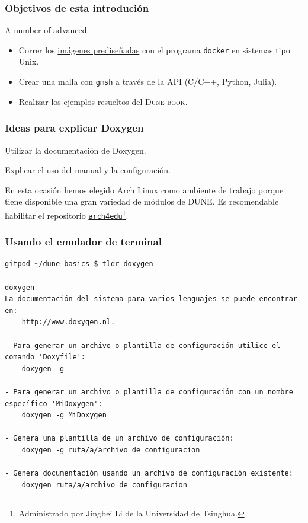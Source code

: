 




\begin{frame}
	\frametitle{Objetivos de esta introdución}
	A number of advanced.
	\begin{itemize}
		\item Correr los \href{https://github.com/orgs/cpp-review-dune/packages}{imágenes prediseñadas} con el programa \lstinline{docker} en sistemas tipo Unix.
		\item Crear una malla con \lstinline{gmsh} a través de la API (C/C++, Python, Julia).
		\item Realizar los ejemplos resueltos del \textsc{Dune book}.
	\end{itemize}
\end{frame}

\begin{frame}
	\frametitle{Ideas para explicar Doxygen}
	\begin{description}
		\item Utilizar la documentación de Doxygen.
		\item Explicar el uso del manual y la configuración.
	\end{description}
\end{frame}

\begin{frame}
	En esta ocasión hemos elegido Arch Linux como ambiente de trabajo porque tiene disponible una gran variedad de módulos de DUNE.
	Es recomendable habilitar el repositorio \href{https://wiki.archlinux.org/title/Unofficial\_user\_repositories\#arch4edu}{\texttt{arch4edu}}\footnote{Administrado por Jingbei Li de la Universidad de Tsinghua.}.
\end{frame}

\begin{frame}
	\frametitle{Usando el emulador de terminal}
\end{frame}

\begin{frame}[fragile]\LARGE
	\begin{lstlisting}
gitpod ~/dune-basics $ tldr doxygen

doxygen
La documentación del sistema para varios lenguajes se puede encontrar en: 
	http://www.doxygen.nl.

- Para generar un archivo o plantilla de configuración utilice el comando 'Doxyfile':
	doxygen -g

- Para generar un archivo o plantilla de configuración con un nombre específico 'MiDoxygen':
	doxygen -g MiDoxygen

- Genera una plantilla de un archivo de configuración:
	doxygen -g ruta/a/archivo_de_configuracion

- Genera documentación usando un archivo de configuración existente:
	doxygen ruta/a/archivo_de_configuracion
\end{lstlisting}
\end{frame}

